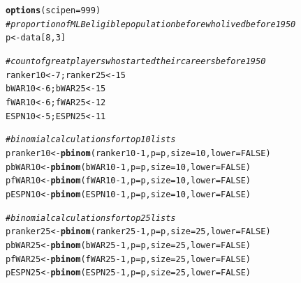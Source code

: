 \documentclass[11pt]{article}\usepackage[]{graphicx}\usepackage[]{color}
\makeatletter
\newcommand{\hlnum}[1]{\textcolor[rgb]{0.686,0.059,0.569}{#1}}%
\newcommand{\hlcom}[1]{\textcolor[rgb]{0.678,0.584,0.686}{\textit{#1}}}%
\newcommand{\hlopt}[1]{\textcolor[rgb]{0,0,0}{#1}}%
\newcommand{\hlstd}[1]{\textcolor[rgb]{0.345,0.345,0.345}{#1}}%
\newcommand{\hlkwb}[1]{\textcolor[rgb]{0.69,0.353,0.396}{#1}}%
\newcommand{\hlkwc}[1]{\textcolor[rgb]{0.333,0.667,0.333}{#1}}%
\newcommand{\hlkwd}[1]{\textcolor[rgb]{0.737,0.353,0.396}{\textbf{#1}}}%
\newenvironment{kframe}{%
 \def\at@end@of@kframe{}%
 \ifinner\ifhmode%
  \def\at@end@of@kframe{\end{minipage}}%
  \begin{minipage}{\columnwidth}%
 \fi\fi%
 \def\FrameCommand##1{\hskip\@totalleftmargin \hskip-\fboxsep
 \colorbox{shadecolor}{##1}\hskip-\fboxsep
     \hskip-\linewidth \hskip-\@totalleftmargin \hskip\columnwidth}%
 \MakeFramed {\advance\hsize-\width
   \@totalleftmargin\z@ \linewidth\hsize
   \@setminipage}}%
 {\par\unskip\endMakeFramed%
 \at@end@of@kframe}
\newenvironment{knitrout}{}{} %
\makeatother
\begin{document}
\begin{knitrout}
\color{fgcolor}\begin{kframe}
\begin{alltt}
\hlkwd{options}\hlstd{(}\hlkwc{scipen}\hlstd{=}\hlnum{999}\hlstd{)}
\hlcom{# proportion of MLB eligible population before who lived before 1950}
\hlstd{p} \hlkwb{<-} \hlstd{data[}\hlnum{8}\hlstd{,} \hlnum{3}\hlstd{]}

\hlcom{# count of great players who started their careers before 1950}
\hlstd{ranker10} \hlkwb{<-} \hlnum{7}\hlstd{; ranker25} \hlkwb{<-} \hlnum{15}
\hlstd{bWAR10} \hlkwb{<-} \hlnum{6}\hlstd{;   bWAR25} \hlkwb{<-} \hlnum{15}
\hlstd{fWAR10} \hlkwb{<-} \hlnum{6}\hlstd{;   fWAR25} \hlkwb{<-} \hlnum{12}
\hlstd{ESPN10} \hlkwb{<-} \hlnum{5}\hlstd{;   ESPN25} \hlkwb{<-} \hlnum{11}

\hlcom{# binomial calculations for top 10 lists}
\hlstd{pranker10} \hlkwb{<-} \hlkwd{pbinom}\hlstd{(ranker10} \hlopt{-} \hlnum{1}\hlstd{,} \hlkwc{p} \hlstd{= p,} \hlkwc{size} \hlstd{=} \hlnum{10}\hlstd{,} \hlkwc{lower} \hlstd{=} \hlnum{FALSE}\hlstd{)}
\hlstd{pbWAR10}   \hlkwb{<-} \hlkwd{pbinom}\hlstd{(bWAR10} \hlopt{-} \hlnum{1}\hlstd{,} \hlkwc{p} \hlstd{= p,} \hlkwc{size} \hlstd{=} \hlnum{10}\hlstd{,} \hlkwc{lower} \hlstd{=} \hlnum{FALSE}\hlstd{)}
\hlstd{pfWAR10}   \hlkwb{<-} \hlkwd{pbinom}\hlstd{(fWAR10} \hlopt{-} \hlnum{1}\hlstd{,} \hlkwc{p} \hlstd{= p,} \hlkwc{size} \hlstd{=} \hlnum{10}\hlstd{,} \hlkwc{lower} \hlstd{=} \hlnum{FALSE}\hlstd{)}
\hlstd{pESPN10}   \hlkwb{<-} \hlkwd{pbinom}\hlstd{(ESPN10} \hlopt{-} \hlnum{1}\hlstd{,} \hlkwc{p} \hlstd{= p,} \hlkwc{size} \hlstd{=} \hlnum{10}\hlstd{,} \hlkwc{lower} \hlstd{=} \hlnum{FALSE}\hlstd{)}

\hlcom{# binomial calculations for top 25 lists}
\hlstd{pranker25} \hlkwb{<-} \hlkwd{pbinom}\hlstd{(ranker25} \hlopt{-} \hlnum{1}\hlstd{,} \hlkwc{p} \hlstd{= p,} \hlkwc{size} \hlstd{=} \hlnum{25}\hlstd{,} \hlkwc{lower} \hlstd{=} \hlnum{FALSE}\hlstd{)}
\hlstd{pbWAR25}   \hlkwb{<-} \hlkwd{pbinom}\hlstd{(bWAR25} \hlopt{-} \hlnum{1}\hlstd{,} \hlkwc{p} \hlstd{= p,} \hlkwc{size} \hlstd{=} \hlnum{25}\hlstd{,} \hlkwc{lower} \hlstd{=} \hlnum{FALSE}\hlstd{)}
\hlstd{pfWAR25}   \hlkwb{<-} \hlkwd{pbinom}\hlstd{(fWAR25} \hlopt{-} \hlnum{1}\hlstd{,} \hlkwc{p} \hlstd{= p,} \hlkwc{size} \hlstd{=} \hlnum{25}\hlstd{,} \hlkwc{lower} \hlstd{=} \hlnum{FALSE}\hlstd{)}
\hlstd{pESPN25}   \hlkwb{<-} \hlkwd{pbinom}\hlstd{(ESPN25} \hlopt{-} \hlnum{1}\hlstd{,} \hlkwc{p} \hlstd{= p,} \hlkwc{size} \hlstd{=} \hlnum{25}\hlstd{,} \hlkwc{lower} \hlstd{=} \hlnum{FALSE}\hlstd{)}
\end{alltt}
\end{kframe}
\end{knitrout}
\end{document}
